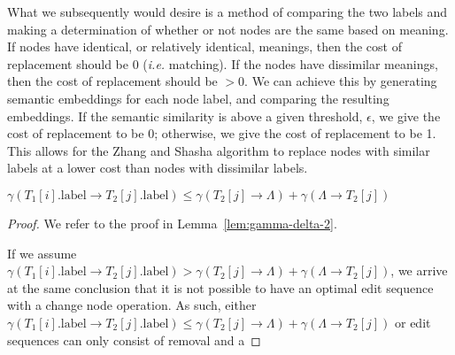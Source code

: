 What we subsequently would desire is a method of comparing the two labels and making a determination of whether or not nodes are the same based on meaning. If nodes have identical, or relatively identical, meanings, then the cost of replacement should be 0 (\textit{i.e.} matching). If the nodes have dissimilar meanings, then the cost of replacement should be $>0$. We can achieve this by generating semantic embeddings for each node label, and comparing the resulting embeddings. If the semantic similarity is above a given threshold, $\epsilon$, we give the cost of replacement to be 0; otherwise, we give the cost of replacement to be 1. This allows for the Zhang and Shasha algorithm to replace nodes with similar labels at a lower cost than nodes with dissimilar labels.




\begin{lemma}
    $\gamma\left(T_1[i].\text{label} \rightarrow T_2[j].\text{label}\right) \le \gamma(T_2[j] \rightarrow {\Lambda}) + \gamma(\Lambda \rightarrow {T_2[j]})$

    \begin{proof}
        We refer to the proof in Lemma~\ref{lem:gamma-delta-2}. 
        
        If we assume $\gamma\left(T_1[i].\text{label} \rightarrow T_2[j].\text{label}\right) > \gamma(T_2[j] \rightarrow {\Lambda}) + \gamma(\Lambda \rightarrow {T_2[j]})$, we arrive at the same conclusion that it is not possible to have an optimal edit sequence with a change node operation. As such, either $\gamma\left(T_1[i].\text{label} \rightarrow T_2[j].\text{label}\right) \le \gamma(T_2[j] \rightarrow {\Lambda}) + \gamma(\Lambda \rightarrow {T_2[j]})$ or edit sequences can only consist of removal and a
    \end{proof}
\end{lemma}




